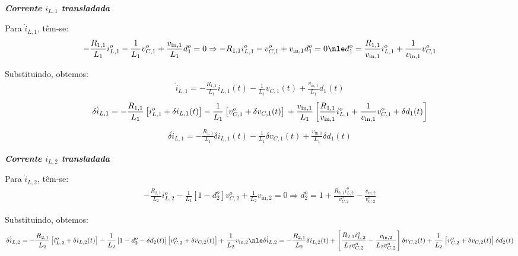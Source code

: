 \textbf{\textit{Corrente $i_{L,1}$ transladada}} \vspace*{12pt}

Para $\dot{i}_{L,1}$, têm-se:
\begin{gather}
  - \frac{R_{1,1}}{L_1} i_{L,1}^o - \frac{1}{L_1} v_{C,1}^o + \frac{v_{\text{in}, 1}}{L_1} d_1^o = 0 \Rightarrow
  - R_{1,1} i_{L,1}^o - v_{C,1}^o + v_{\text{in}, 1} d_1^o = 0 \nle
  d_1^o = \frac{R_{1,1}}{v_{\text{in}, 1}} i_{L,1}^o + \frac{1}{v_{\text{in}, 1}} v_{C,1}^o
\end{gather}

Substituindo, obtemos:
\begin{gather*}
  \dot{i}_{L,1} = - \frac{R_{1,1}}{L_1} i_{L,1}(t) - \frac{1}{L_1} v_{C,1}(t) + \frac{v_{\text{in}, 1}}{L_1} d_1(t)
\end{gather*}
\begin{equation}
  \delta \dot{i}_{L,1} = - \frac{R_{1,1}}{L_1} \left[i_{L,1}^o + \delta i_{L,1}(t)\right]
  - \frac{1}{L_1} \left[v_{C,1}^o + \delta v_{C,1}(t)\right] \\
  + \frac{v_{\text{in}, 1}}{L_1} \left[\frac{R_{1,1}}{v_{\text{in}, 1}} i_{L,1}^o + \frac{1}{v_{\text{in}, 1}} v_{C,1}^o + \delta d_1(t)\right]
\end{equation}
\begin{gather}
  \delta \dot{i}_{L,1} = - \frac{R_{1,1}}{L_1} \delta i_{L,1}(t) - \frac{1}{L_1} \delta v_{C,1}(t)
  + \frac{v_{\text{in}, 1}}{L_1} \delta d_1(t)
\end{gather}

\textbf{\textit{Corrente $i_{L,2}$ transladada}} \vspace*{12pt}

Para $\dot{i}_{L,2}$, têm-se:
\begin{gather}
  - \frac{R_{2,1}}{L_2} i_{L,2}^o - \frac{1}{L_2} \left[1 - d_2^o\right] v_{C,2}^o + \frac{1}{L_2} v_{\text{in},2} = 0 \Rightarrow
  d_2^o = 1 + \frac{R_{2,1}i_{L,2}^o}{v_{C,2}^o} - \frac{v_{\text{in},2}}{v_{C,2}^o}
\end{gather}

Substituindo, obtemos:
\begin{gather}
  \delta \dot{i}_{L,2} = - \frac{R_{2,1}}{L_2} \left[i_{L,2}^o + \delta i_{L,2}(t)\right] - \frac{1}{L_2} \left[1 - d_2^o - \delta d_2(t)\right] \left[v_{C,2}^o + \delta v_{C,2}(t)\right] + \frac{1}{L_2} v_{\text{in},2} \nle
  \delta \dot{i}_{L,2} = - \frac{R_{2,1}}{L_2} \delta i_{L,2}(t)
  + \left[\frac{R_{2,1} i_{L,2}^o}{L_2 v_{C,2}^o} - \frac{v_{\text{in},2}}{L_2 v_{C,2}^o}\right] \delta v_{C,2}(t) + \frac{1}{L_2} \left[v_{C,2}^o + \delta v_{C,2}(t)\right] \delta d_2(t)
\end{gather}

